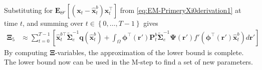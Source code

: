 \documentclass[]{article}
\begin{document}
Substituting for $\mathbf E_{\Theta'}\left[(\mathbf x_t - \mathbf  {\hat x}_t^b)\mathbf x_t^\top\right] $ from \eqref{eq:EM-PrimeryXi0derivation1} at time $t$, and summing over $t \in \left\lbrace 0, \dots, T-1\right\rbrace $ gives
\begin{align}
\boldsymbol\Xi_{5}&\approx\sum_{t=0}^{T-1}\left[ \mathbf{\hat x}_{t}^{b\top}\tilde{\boldsymbol\Sigma}_e^{-1}\mathbf q(\mathbf{\hat x}_t^b)+\int_\Omega\boldsymbol \phi^\top(\mathbf r') \mathbf P_t^b \tilde{\boldsymbol\Sigma}_e^{-1}  \boldsymbol{\Psi}(\mathbf{r}') f'(\boldsymbol \phi^\top(\mathbf r')\mathbf {\hat x}_t^b) d\mathbf{r}'\right] \label{eq:Xi5Ap}
 \end{align}
By computing $\boldsymbol\Xi$-variables, the approximation of the lower bound is complete. The lower bound now can be used in the M-step to find a set of new parameters. 
\end{document}
